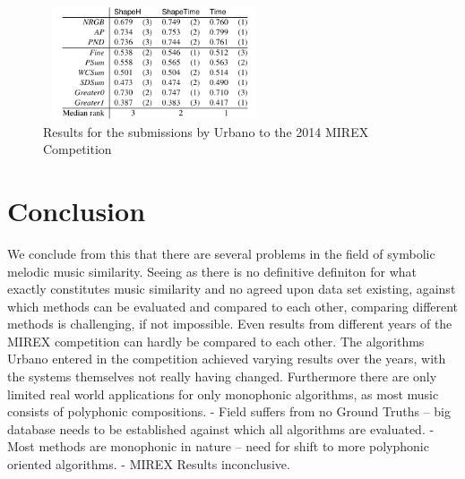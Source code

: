 \documentclass{llncs}
\begin{document}
        \begin{figure}[h!]
			\centering
            \includegraphics[width=250px,height=125px,keepaspectratio]{urbano_mirex_2014_results}
			\caption{Results for the submissions by Urbano to the 2014 MIREX Competition \cite{five_point_two}}
        \end{figure}




	\section{Conclusion}

	We conclude from this that there are several problems in the field of symbolic melodic music similarity.
	Seeing as there is no definitive definiton for what exactly constitutes music similarity and no agreed upon data set existing, against which methods can be evaluated and compared to each other, comparing different methods is challenging, if not impossible. Even results from different years of the MIREX competition can hardly be compared to each other. The algorithms Urbano entered in the competition achieved varying results over the years, with the systems themselves not really having changed. Furthermore there are only limited real world applications for only monophonic algorithms, as most music consists of polyphonic compositions. 
	- Field suffers from no Ground Truths -- big database needs to be established against which all algorithms are evaluated. 
	- Most methods are monophonic in nature -- need for shift to more polyphonic oriented algorithms.
	- MIREX Results inconclusive. 
	
\end{document}
